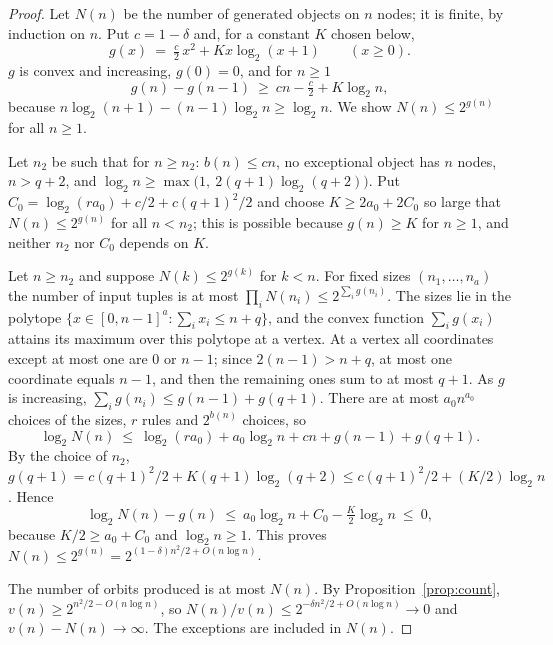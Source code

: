 \documentclass[11pt,a4paper]{article}
\theoremstyle{definition}
\theoremstyle{remark}
\begin{document}
\begin{proof}
Let $N(n)$ be the number of generated objects on $n$ nodes; it is finite, by induction on $n$. Put $c = 1 - \delta$
and, for a constant $K$ chosen below,
\[
  g(x) \ =\ \tfrac{c}{2}\,x^2 + K x \log_2(x + 1) \qquad (x \ge 0).
\]
$g$ is convex and increasing, $g(0) = 0$, and for $n \ge 1$
\[
  g(n) - g(n - 1) \ \ge\ cn - \tfrac{c}{2} + K \log_2 n,
\]
because $n \log_2(n + 1) - (n - 1)\log_2 n \ge \log_2 n$. We show $N(n) \le 2^{g(n)}$ for all $n \ge 1$.

Let $n_2$ be such that for $n \ge n_2$: $b(n) \le cn$, no exceptional object has $n$ nodes, $n > q + 2$, and
$\log_2 n \ge \max\bigl(1,\ 2(q + 1)\log_2(q + 2)\bigr)$. Put $C_0 = \log_2(r a_0) + c/2 + c(q + 1)^2/2$ and choose
$K \ge 2a_0 + 2C_0$ so large that $N(n) \le 2^{g(n)}$ for all $n < n_2$; this is possible because
$g(n) \ge K$ for $n \ge 1$, and neither $n_2$ nor $C_0$ depends on $K$.

Let $n \ge n_2$ and suppose $N(k) \le 2^{g(k)}$ for $k < n$. For fixed sizes $(n_1, \dots, n_a)$ the number of input
tuples is at most $\prod_i N(n_i) \le 2^{\sum_i g(n_i)}$. The sizes lie in the polytope
$\{x \in [0, n - 1]^a : \sum_i x_i \le n + q\}$, and the convex function $\sum_i g(x_i)$ attains its maximum over
this polytope at a vertex. At a vertex all coordinates except at most one are $0$ or $n - 1$; since
$2(n - 1) > n + q$, at most one coordinate equals $n - 1$, and then the remaining ones sum to at most $q + 1$. As $g$
is increasing, $\sum_i g(n_i) \le g(n - 1) + g(q + 1)$. There are at most $a_0 n^{a_0}$ choices of the sizes, $r$
rules and $2^{b(n)}$ choices, so
\[
  \log_2 N(n) \ \le\ \log_2(r a_0) + a_0 \log_2 n + cn + g(n - 1) + g(q + 1).
\]
By the choice of $n_2$, $g(q + 1) = c(q + 1)^2/2 + K(q + 1)\log_2(q + 2) \le c(q + 1)^2/2 + (K/2)\log_2 n$. Hence
\[
  \log_2 N(n) - g(n) \ \le\ a_0 \log_2 n + C_0 - \tfrac{K}{2}\log_2 n \ \le\ 0,
\]
because $K/2 \ge a_0 + C_0$ and $\log_2 n \ge 1$. This proves $N(n) \le 2^{g(n)} = 2^{(1-\delta)n^2/2 + O(n \log n)}$.

The number of orbits produced is at most $N(n)$. By Proposition~\ref{prop:count},
$v(n) \ge 2^{n^2/2 - O(n \log n)}$, so $N(n)/v(n) \le 2^{-\delta n^2/2 + O(n \log n)} \to 0$ and
$v(n) - N(n) \to \infty$. The exceptions are included in $N(n)$.
\end{proof}
\end{document}
